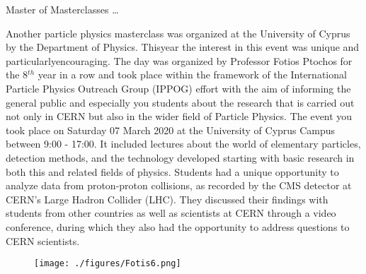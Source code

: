\begin{MyArticle}[enhanced, tikz={rotate=0}, width=0.6\textwidth]{Master of Masterclasses \ldots}
  \begin{multicols}{2}
    Another particle physics 
    masterclass was organized at the University of Cyprus by the
    Department of Physics. Thisyear the interest in this event was
    unique and particularlyencouraging. The day  was organized by Professor Fotios Ptochos for the 8$^{th}$ year
    in a row and took place within the framework of the
    International Particle Physics Outreach Group (IPPOG)
    effort with the aim of informing the general
    public and especially you students about the research that is
    carried out not only in CERN but also in the wider field of
    Particle Physics. The event you took place on Saturday 07 March
    2020 at the University of Cyprus Campus between 9:00 - 17:00. It 
    included lectures about the world of elementary particles,
    detection methods, and the technology developed starting with basic research in both this and
    related fields of physics. Students had a unique opportunity to
    analyze data from proton-proton collisions, as recorded by the CMS
    detector at CERN's Large Hadron Collider (LHC). They discussed their
    findings with students from other countries as well as scientists
    at CERN through a video conference, during which they also had the
    opportunity to address questions to CERN scientists. 
    \begin{figure}
      \begin{center}
        \leavevmode
        \texttt{[image: ./figures/Fotis6.png]}
      \end{center}
    \end{figure}
  \end{multicols}
\end{MyArticle}
